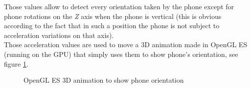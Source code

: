 \documentclass[conference, 11pt]{IEEEtran}
\begin{document}
Those values allow to detect every orientation taken by the phone except for phone rotations on the \textit{Z} axis when the phone is vertical (this is obvious according to the fact that in such a position the phone is not subject to acceleration variations on that axis).\\
Those acceleration values are used to move a 3D animation made in OpenGL ES (running on the GPU) that simply uses them to show phone's orientation, see figure \ref{img:opengl}.

\begin{figure}[!ht]
\begin{center}
\caption{OpenGL ES 3D animation to show phone orientation}
\label{img:opengl}
\end{center}
\end{figure}
\end{document}
